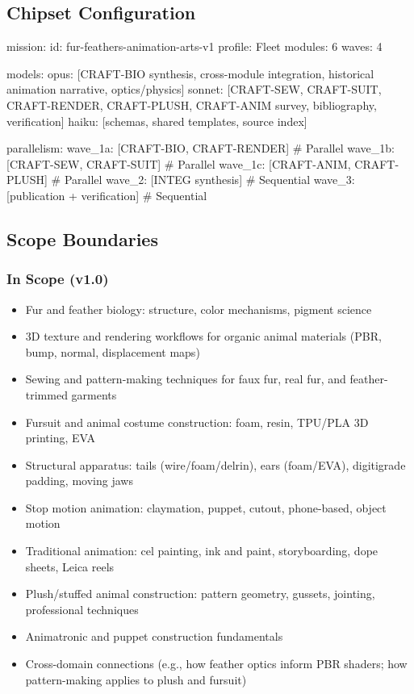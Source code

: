 \documentclass[11pt,letterpaper]{article}
\begin{document}
\subsection{Chipset Configuration}

\begin{asciibox}
mission:
  id: fur-feathers-animation-arts-v1
  profile: Fleet
  modules: 6
  waves: 4

models:
  opus:   [CRAFT-BIO synthesis, cross-module integration,
           historical animation narrative, optics/physics]
  sonnet: [CRAFT-SEW, CRAFT-SUIT, CRAFT-RENDER, CRAFT-PLUSH,
           CRAFT-ANIM survey, bibliography, verification]
  haiku:  [schemas, shared templates, source index]

parallelism:
  wave_1a: [CRAFT-BIO, CRAFT-RENDER]     # Parallel
  wave_1b: [CRAFT-SEW, CRAFT-SUIT]       # Parallel
  wave_1c: [CRAFT-ANIM, CRAFT-PLUSH]     # Parallel
  wave_2:  [INTEG synthesis]             # Sequential
  wave_3:  [publication + verification]  # Sequential
\end{asciibox}

\subsection{Scope Boundaries}

\subsubsection{In Scope (v1.0)}

\begin{itemize}[noitemsep]
  \item Fur and feather biology: structure, color mechanisms, pigment science
  \item 3D texture and rendering workflows for organic animal materials (PBR, bump, normal, displacement maps)
  \item Sewing and pattern-making techniques for faux fur, real fur, and feather-trimmed garments
  \item Fursuit and animal costume construction: foam, resin, TPU/PLA 3D printing, EVA
  \item Structural apparatus: tails (wire/foam/delrin), ears (foam/EVA), digitigrade padding, moving jaws
  \item Stop motion animation: claymation, puppet, cutout, phone-based, object motion
  \item Traditional animation: cel painting, ink and paint, storyboarding, dope sheets, Leica reels
  \item Plush/stuffed animal construction: pattern geometry, gussets, jointing, professional techniques
  \item Animatronic and puppet construction fundamentals
  \item Cross-domain connections (e.g., how feather optics inform PBR shaders; how pattern-making applies to plush and fursuit)
\end{itemize}
\end{document}
